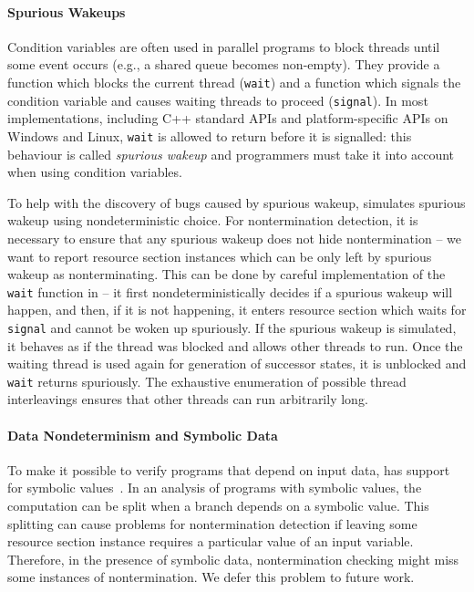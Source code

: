\paragraph{Spurious Wakeups}

Condition variables are often used in parallel programs to block threads until some event occurs (e.g., a shared queue becomes non-empty).
They provide a function which blocks the current thread (\texttt{wait}) and a function which signals the condition variable and causes waiting threads to proceed (\texttt{signal}).
In most implementations, including C++ standard APIs and platform-specific APIs on Windows and Linux, \texttt{wait} is allowed to return before it is signalled: this behaviour is called \emph{spurious wakeup} and programmers must take it into account when using condition variables.

To help with the discovery of bugs caused by spurious wakeup, \divine simulates
spurious wakeup using nondeterministic choice.
For nontermination detection, it is necessary to ensure that any spurious wakeup does not hide nontermination -- we want to report resource section instances which can be only left by spurious wakeup as nonterminating.
This can be done by careful implementation of the \texttt{wait} function in
\divine{} -- it first nondeterministically decides if a spurious wakeup will
happen, and then, if it is not happening, it enters resource section which waits
for \texttt{signal} and cannot be woken up spuriously.
If the spurious wakeup is simulated, it behaves as if the thread was blocked and allows other threads to run.
Once the waiting thread is used again for generation of successor states, it is unblocked and \texttt{wait} returns spuriously.
The exhaustive enumeration of possible thread interleavings ensures that other threads can run arbitrarily long.

\paragraph{Data Nondeterminism and Symbolic Data}
%
To make it possible to verify programs that depend on input data, \divine has support for symbolic values~\cite{LRB18}.
In an analysis of programs with symbolic values, the computation can be split when a branch depends on a symbolic value.
This splitting can cause problems for nontermination detection if leaving some resource section instance requires a particular value of an input variable.
Therefore, in the presence of symbolic data, nontermination checking might miss some instances of nontermination.
We defer this problem to future work.

